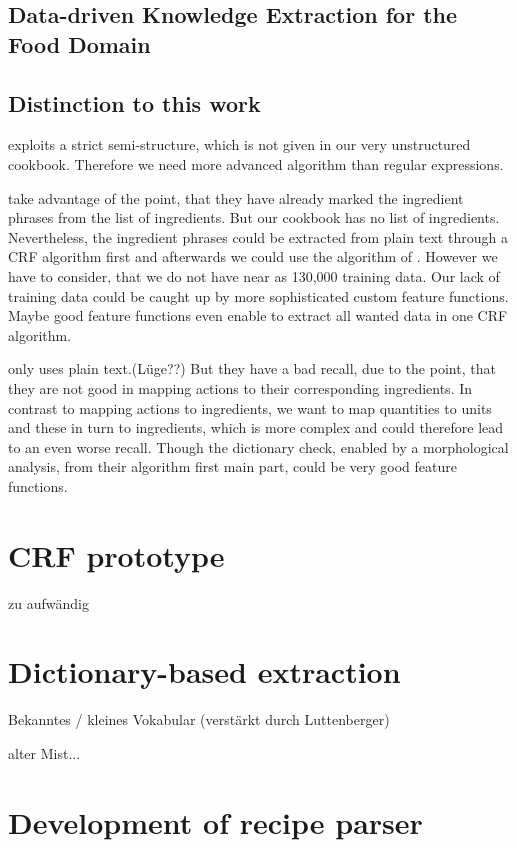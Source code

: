 \documentclass[12pt, twoside]{report}
\begin{document}
\section{Data-driven Knowledge Extraction for the Food Domain}
\parencite{konvens07_wiegand12o}


\section{Distinction to this work}
\parencite{REgutGenug} exploits a strict semi-structure, which is not given in our very unstructured cookbook. Therefore we need more advanced algorithm than regular expressions.

\parencite{CRFZeit} take advantage of the point, that they have already marked the ingredient phrases from the list of ingredients. But our cookbook has no list of ingredients. Nevertheless, the ingredient phrases could be extracted from plain text through a CRF algorithm first and afterwards we could use the algorithm of \parencite{CRFZeit}. However we have to consider, that we do not have near as 130,000 training data. Our lack of training data could be caught up by more sophisticated custom feature functions. Maybe good feature functions even enable to extract all wanted data in one CRF algorithm.

\parencite{GrammaBased} only uses plain text.(Lüge??) But they have a bad recall, due to the point, that they are not good in mapping actions to their corresponding ingredients. 
In contrast to mapping actions to ingredients, we want to map quantities to units and these in turn to ingredients, which is more complex and could therefore lead to an even worse recall. Though the dictionary check, enabled by a morphological analysis, from their algorithm first main part, could be very good feature functions.



\chapter{CRF prototype}
zu aufwändig

\chapter{Dictionary-based extraction}
Bekanntes / kleines Vokabular (verstärkt durch Luttenberger)

alter Mist...
\chapter{Development of recipe parser}
\end{document}
